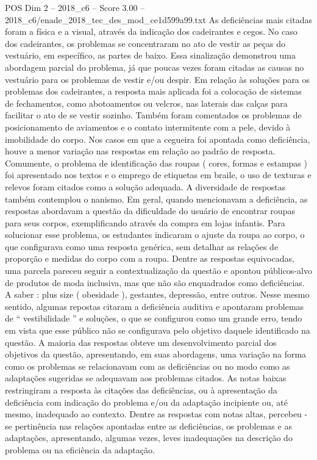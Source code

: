 \begin{textsample}{POS Dim 2 – 2018\_c6 – Score 3.00 – 2018\_c6/enade\_2018\_tec\_des\_mod\_ce1d599a99.txt}
As deficiências mais citadas foram a física e a visual, através da indicação dos cadeirantes e cegos.
No caso dos cadeirantes, os problemas se concentraram no ato de vestir as peças do vestuário, em específico, as partes de baixo.
Essa sinalização demonstrou uma abordagem parcial do problema, já que poucas vezes foram citadas as causas no vestuário para os problemas de vestir e/ou despir.
Em relação às soluções para os problemas dos cadeirantes, a resposta mais aplicada foi a colocação de sistemas de fechamentos, como abotoamentos ou velcros, nas laterais das calças para facilitar o ato de se vestir sozinho.
Também foram comentados os problemas de posicionamento de aviamentos e o contato intermitente com a pele, devido à imobilidade do corpo.
Nos casos em que a cegueira foi apontada como deficiência, houve a menor variação nas respostas em relação ao padrão de resposta.
Comumente, o problema de identificação das roupas ( cores, formas e estampas ) foi apresentado nos textos e o emprego de etiquetas em braile, o uso de texturas e relevos foram citados como a solução adequada.
A diversidade de respostas também contemplou o nanismo.
Em geral, quando mencionavam a deficiência, as respostas abordavam a questão da dificuldade do usuário de encontrar roupas para seus corpos, exemplificando através da compra em lojas infantis.
Para solucionar esse problema, os estudantes indicaram o ajuste da roupa ao corpo, o que configurava como uma resposta genérica, sem detalhar as relações de proporção e medidas do corpo com a roupa.
Dentre as respostas equivocadas, uma parcela pareceu seguir a contextualização da questão e apontou públicos-alvo de produtos de moda inclusiva, mas que não são enquadrados como deficiências.
A saber : plus size ( obesidade ), gestantes, depressão, entre outros.
Nesse mesmo sentido, algumas repostas citaram a deficiência auditiva e apontaram problemas de “ vestibilidade ” e soluções, o que se configurou como um grande erro, tendo em vista que esse público não se configurava pelo objetivo daquele identificado na questão.
A maioria das respostas obteve um desenvolvimento parcial dos objetivos da questão, apresentando, em suas abordagens, uma variação na forma como os problemas se relacionavam com as deficiências ou no modo como as adaptações sugeridas se adequavam aos problemas citados.
As notas baixas restringiram a resposta às citações das deficiências, ou à apresentação da deficiência com indicação do problema e/ou da adaptação incipiente ou, até mesmo, inadequado ao contexto.
Dentre as respostas com notas altas, percebeu -se pertinência nas relações apontadas entre as deficiências, os problemas e as adaptações, apresentando, algumas vezes, leves inadequações na descrição do problema ou na eficiência da adaptação.

\end{textsample}
